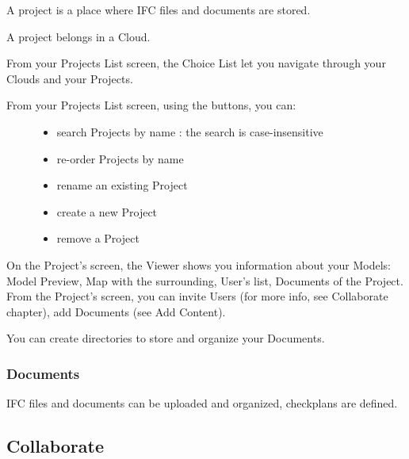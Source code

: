 \documentclass[a4paper,12pt,english]{sphinxmanual}
\begin{document}
A project is a place where IFC files and documents are stored.

A project belongs in a Cloud.

From your Projects List screen, the Choice List let you navigate through your Clouds and your Projects.
\begin{description}
\item[{From your Projects List screen, using the buttons, you can:}] \leavevmode\begin{itemize}
\item {} 
search Projects by name : the search is case-insensitive

\item {} 
re-order Projects by name

\item {} 
rename an existing Project

\item {} 
create a new Project

\item {} 
remove a Project

\end{itemize}

\end{description}

On the Project’s screen, the Viewer shows you information about your Models: Model Preview, Map with the surrounding, User’s list, Documents of the Project.
From the Project’s screen, you can invite Users (for more info, see Collaborate chapter), add Documents (see Add Content).

You can create directories to store and organize your Documents.


\subsubsection{Documents}
\label{\detokenize{platform/organize:documents}}
\begin{figure}[htbp]
\centering

\noindent{}
\end{figure}

IFC files and documents can be uploaded and organized, checkplans are defined.


\subsection{Collaborate}
\label{\detokenize{platform/collaborate:collaborate}}\label{\detokenize{platform/collaborate::doc}}
\end{document}
